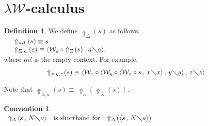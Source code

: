 \documentclass[11pt]{amsart}
\theoremstyle{plain}
\theoremstyle{definition}
\newtheorem{definition}[theorem]{Definition}
\newtheorem{convention}[theorem]{Convention}
\theoremstyle{remark}
\numberwithin{equation}{section}
\newcommand{\ci}{\circ}
\newcommand{\mi}{\,,\,}
\newcommand{\is}{\diagdown}
\newcommand{\la}{\langle}
\newcommand{\ra}{\rangle}
\newcommand{\x}{a}
\renewcommand{\pi}{\mathcal{W}}
\begin{document}
\newpage



\section{ $\lambda\pi$-calculus }
\begin{definition}\label{uparrow}We define  $\Uparrow_{\Delta}\!(s)$ as follows:
\\
$
\begin{array}{ll}
& \Uparrow_{nil}(s) \equiv s\\
& \Uparrow_{\Sigma,\x}(s)
\equiv\langle\pi_{\x}\,\ci\Uparrow_{\Sigma}\!(s)\mi \x\is
\x\rangle,
\end{array}
$\\[5pt] where $nil$ is the empty context. For example,
$$\Uparrow_{x,y,z}\!(s)\equiv\langle\pi_{z}\ci\langle\pi_{y}\ci\langle\pi_{x}\ci
s\mi x\is x\rangle\mi y\is y\rangle\mi z\is z\rangle$$
\end{definition}

Note that
$\Uparrow_{\Sigma,\x}\!(s)\equiv\,\Uparrow_{\x}\!\!(\Uparrow_{\Sigma}\!(s))$.
\begin{convention}$ $\\
$
\begin{array}{lll}
\Uparrow_{\Delta}\!\la s\mi N\is \x\ra & \text{is shorthand for} &
\Uparrow_{\Delta}\!(\la s\mi N\is \x\ra)
\end{array}
$
\end{convention}
\end{document}
